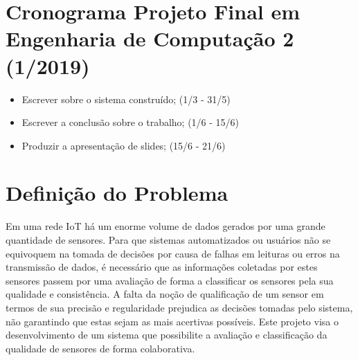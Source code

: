 %
\newpage
 \section{Cronograma Projeto Final em Engenharia de Computação 2 (1/2019)}

\begin{itemize}
  \item Escrever sobre o sistema construído; (1/3 - 31/5)
  \item Escrever a conclusão sobre o trabalho; (1/6 - 15/6)
  \item Produzir a apresentação de slides; (15/6 - 21/6)
\end{itemize}

\newpage
 \section{Definição do Problema}
 Em uma rede \acrshort{IoT} há um enorme volume de dados gerados por uma grande quantidade de sensores. Para que sistemas automatizados ou usuários não se equivoquem
  na tomada de decisões por causa de falhas em leituras ou erros na transmissão de dados,
  é necessário que as informações coletadas por estes sensores passem por uma avaliação de forma a
 classificar os sensores pela sua qualidade e consistência.
 A falta da noção de qualificação de um sensor em termos de sua precisão e regularidade prejudica as decisões tomadas pelo sistema,
  não garantindo que estas sejam as mais acertivas possíveis.
Este projeto visa o desenvolvimento de um sistema que possibilite a avaliação e classificação da qualidade de sensores de forma colaborativa.


